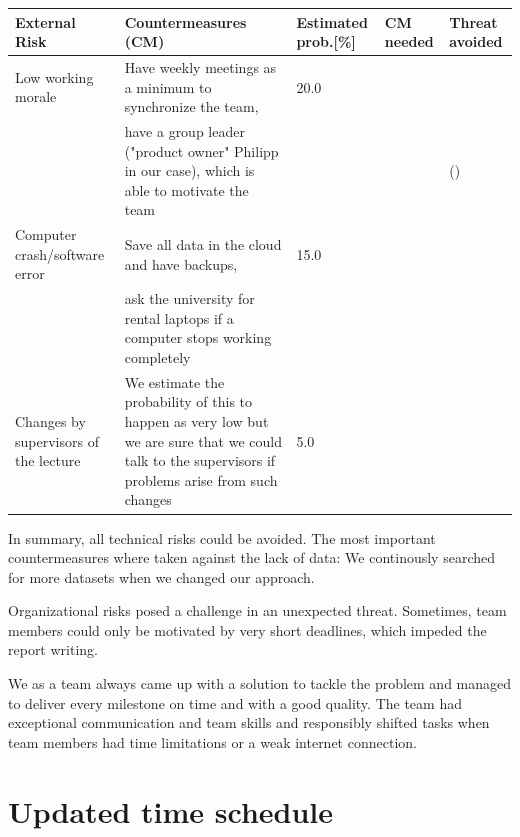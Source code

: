 \begin{center}
	\begin{footnotesize}
		\setlength{\arrayrulewidth}{1,05pt}
		\begin{tabular}[htb]{|p{2cm}|p{5cm}|p{1.5cm}|p{1cm}|p{1cm}|}
			\hline
			\textbf{External Risk}& \textbf{Countermeasures (CM)} &
			\textbf{Estimated prob.[\%]} &\textbf{CM needed} & \textbf{Threat avoided} \\
			\hline
			\hline
			\rowcolor{slightlylightergray} Low working morale & Have weekly meetings as a minimum to synchronize the team, & 20.0&\cmark &\cmark\\
			\rowcolor{slightlylightergray} & have a group leader ("product owner" Philipp in our case), which is able to motivate the team & &\cmark &(\cmark)\\
			\hline
			\rowcolor{slightlylightergray} Computer crash/software error & Save all data in the cloud and have backups, & 15.0&\xmark &\cmark\\
			\rowcolor{slightlylightergray} & ask the university for rental laptops if a computer stops working completely & &\xmark &\cmark\\
			\hline	
			\rowcolor{slightlylightergray} Changes by supervisors of the lecture & We estimate the probability of this to happen as very low but we are sure that we could talk to the supervisors if problems arise from such changes & 5.0&\xmark &\cmark\\
			\hline
		\end{tabular}
	\end{footnotesize}
\end{center}
	In summary, all technical risks could be avoided. The most important countermeasures where taken against the lack of data: We continously searched for more datasets when we changed our approach. 
	
	
	
	Organizational risks posed a challenge in an unexpected threat. Sometimes, team members could only be motivated by very short deadlines, which impeded the report writing. 
	
	We as a team always came up with a solution to tackle the problem and managed to deliver every milestone on time and with a good quality. The team had exceptional communication and team skills and responsibly shifted tasks when team members had time limitations or a weak internet connection.
	
	\section*{Updated time schedule}
	
